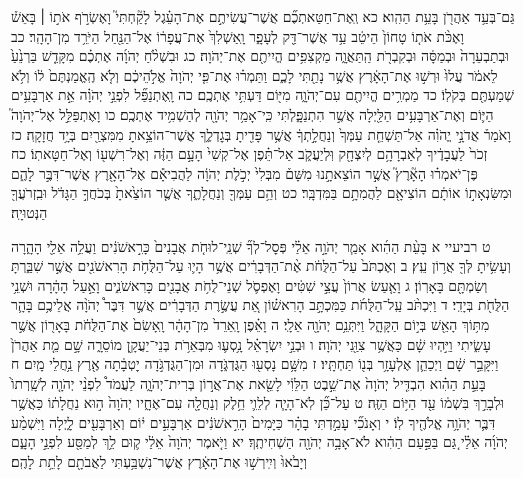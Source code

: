 \documentclass[twoside, openany, parskip=half, 11pt]{book}
\begin{document}
גַּם־בְּעַ֥ד אַהֲרֹ֖ן בָּעֵ֥ת הַהִֽוא׃ כא וְֽאֶת־חַטַּאתְכֶ֞ם אֲשֶׁר־עֲשִׂיתֶ֣ם אֶת־הָעֵ֗גֶל לָקַ֘חְתִּי֮ וָאֶשְׂרֹ֣ף אֹת֣וֹ ׀ בָּאֵשׁ֒ וָאֶכֹּ֨ת אֹת֤וֹ טָחוֹן֙ הֵיטֵ֔ב עַ֥ד אֲשֶׁר־דַּ֖ק לְעָפָ֑ר וָֽאַשְׁלִךְ֙ אֶת־עֲפָר֔וֹ אֶל־הַנַּ֖חַל הַיֹּרֵ֥ד מִן־הָהָֽר׃ כב וּבְתַבְעֵרָה֙ וּבְמַסָּ֔ה וּבְקִבְרֹ֖ת הַֽתַּאֲוָ֑ה מַקְצִפִ֥ים הֱיִיתֶ֖ם אֶת־יְהֹוָה׃ כג וּבִשְׁלֹ֨חַ יְהֹוָ֜ה אֶתְכֶ֗ם מִקָּדֵ֤שׁ בַּרְנֵ֙עַ֙ לֵאמֹ֔ר עֲלוּ֙ וּרְשׁ֣וּ אֶת־הָאָ֔רֶץ אֲשֶׁ֥ר נָתַ֖תִּי לָכֶ֑ם וַתַּמְר֗וּ אֶת־פִּ֤י יְהֹוָה֙ אֱלֹ֣הֵיכֶ֔ם וְלֹ֤א הֶֽאֱמַנְתֶּם֙ ל֔וֹ וְלֹ֥א שְׁמַעְתֶּ֖ם בְּקֹלֽוֹ׃ כד מַמְרִ֥ים הֱיִיתֶ֖ם עִם־יְהֹוָ֑ה מִיּ֖וֹם דַּעְתִּ֥י אֶתְכֶֽם׃ כה וָֽאֶתְנַפַּ֞ל לִפְנֵ֣י יְהֹוָ֗ה אֵ֣ת אַרְבָּעִ֥ים הַיּ֛וֹם וְאֶת־אַרְבָּעִ֥ים הַלַּ֖יְלָה אֲשֶׁ֣ר הִתְנַפָּ֑לְתִּי כִּֽי־אָמַ֥ר יְהֹוָ֖ה לְהַשְׁמִ֥יד אֶתְכֶֽם׃ כו וָאֶתְפַּלֵּ֣ל אֶל־יְהֹוָה֮ וָאֹמַר֒ אֲדֹנָ֣י יֱהֹוִ֗ה אַל־תַּשְׁחֵ֤ת עַמְּךָ֙ וְנַחֲלָ֣תְךָ֔ אֲשֶׁ֥ר פָּדִ֖יתָ בְּגׇדְלֶ֑ךָ אֲשֶׁר־הוֹצֵ֥אתָ מִמִּצְרַ֖יִם בְּיָ֥ד חֲזָקָֽה׃ כז זְכֹר֙ לַעֲבָדֶ֔יךָ לְאַבְרָהָ֥ם לְיִצְחָ֖ק וּֽלְיַעֲקֹ֑ב אַל־תֵּ֗פֶן אֶל־קְשִׁי֙ הָעָ֣ם הַזֶּ֔ה וְאֶל־רִשְׁע֖וֹ וְאֶל־חַטָּאתֽוֹ׃ כח פֶּן־יֹאמְר֗וּ הָאָ֘רֶץ֮ אֲשֶׁ֣ר הוֹצֵאתָ֣נוּ מִשָּׁם֒ מִבְּלִי֙ יְכֹ֣לֶת יְהֹוָ֔ה לַהֲבִיאָ֕ם אֶל־הָאָ֖רֶץ אֲשֶׁר־דִּבֶּ֣ר לָהֶ֑ם וּמִשִּׂנְאָת֣וֹ אוֹתָ֔ם הוֹצִיאָ֖ם לַהֲמִתָ֥ם בַּמִּדְבָּֽר׃ כט וְהֵ֥ם עַמְּךָ֖ וְנַחֲלָתֶ֑ךָ אֲשֶׁ֤ר הוֹצֵ֙אתָ֙ בְּכֹחֲךָ֣ הַגָּדֹ֔ל וּבִֽזְרֹעֲךָ֖ הַנְּטוּיָֽה׃

ט רביעיי א בָּעֵ֨ת הַהִ֜וא אָמַ֧ר יְהֹוָ֣ה אֵלַ֗י פְּסׇל־לְךָ֞ שְׁנֵֽי־לוּחֹ֤ת אֲבָנִים֙ כָּרִ֣אשֹׁנִ֔ים וַעֲלֵ֥ה אֵלַ֖י הָהָ֑רָה וְעָשִׂ֥יתָ לְּךָ֖ אֲר֥וֹן עֵֽץ׃ ב וְאֶכְתֹּב֙ עַל־הַלֻּחֹ֔ת אֶ֨ת־הַדְּבָרִ֔ים אֲשֶׁ֥ר הָי֛וּ עַל־הַלֻּחֹ֥ת הָרִאשֹׁנִ֖ים אֲשֶׁ֣ר שִׁבַּ֑רְתָּ וְשַׂמְתָּ֖ם בָּאָרֽוֹן׃ ג וָאַ֤עַשׂ אֲרוֹן֙ עֲצֵ֣י שִׁטִּ֔ים וָאֶפְסֹ֛ל שְׁנֵי־לֻחֹ֥ת אֲבָנִ֖ים כָּרִאשֹׁנִ֑ים וָאַ֣עַל הָהָ֔רָה וּשְׁנֵ֥י הַלֻּחֹ֖ת בְּיָדִֽי׃ ד וַיִּכְתֹּ֨ב עַֽל־הַלֻּחֹ֜ת כַּמִּכְתָּ֣ב הָרִאשׁ֗וֹן אֵ֚ת עֲשֶׂ֣רֶת הַדְּבָרִ֔ים אֲשֶׁ֣ר דִּבֶּר֩ יְהֹוָ֨ה אֲלֵיכֶ֥ם בָּהָ֛ר מִתּ֥וֹךְ הָאֵ֖שׁ בְּי֣וֹם הַקָּהָ֑ל וַיִּתְּנֵ֥ם יְהֹוָ֖ה אֵלָֽי׃ ה וָאֵ֗פֶן וָֽאֵרֵד֙ מִן־הָהָ֔ר וָֽאָשִׂם֙ אֶת־הַלֻּחֹ֔ת בָּאָר֖וֹן אֲשֶׁ֣ר עָשִׂ֑יתִי וַיִּ֣הְיוּ שָׁ֔ם כַּאֲשֶׁ֥ר צִוַּ֖נִי יְהֹוָה׃ ו וּבְנֵ֣י יִשְׂרָאֵ֗ל נָ֥סְע֛וּ מִבְּאֵרֹ֥ת בְּנֵי־יַעֲקָ֖ן מוֹסֵרָ֑ה שָׁ֣ם מֵ֤ת אַהֲרֹן֙ וַיִּקָּבֵ֣ר שָׁ֔ם וַיְכַהֵ֛ן אֶלְעָזָ֥ר בְּנ֖וֹ תַּחְתָּֽיו׃ ז מִשָּׁ֥ם נָסְע֖וּ הַגֻּדְגֹּ֑דָה וּמִן־הַגֻּדְגֹּ֣דָה יׇטְבָ֔תָה אֶ֖רֶץ נַ֥חֲלֵי מָֽיִם׃ ח בָּעֵ֣ת הַהִ֗וא הִבְדִּ֤יל יְהֹוָה֙ אֶת־שֵׁ֣בֶט הַלֵּוִ֔י לָשֵׂ֖את אֶת־אֲר֣וֹן בְּרִית־יְהֹוָ֑ה לַעֲמֹד֩ לִפְנֵ֨י יְהֹוָ֤ה לְשָֽׁרְתוֹ֙ וּלְבָרֵ֣ךְ בִּשְׁמ֔וֹ עַ֖ד הַיּ֥וֹם הַזֶּֽה׃ ט עַל־כֵּ֞ן לֹֽא־הָיָ֧ה לְלֵוִ֛י חֵ֥לֶק וְנַחֲלָ֖ה עִם־אֶחָ֑יו יְהֹוָה֙ ה֣וּא נַחֲלָת֔וֹ כַּאֲשֶׁ֥ר דִּבֶּ֛ר יְהֹוָ֥ה אֱלֹהֶ֖יךָ לֽוֹ׃ י וְאָנֹכִ֞י עָמַ֣דְתִּי בָהָ֗ר כַּיָּמִים֙ הָרִ֣אשֹׁנִ֔ים אַרְבָּעִ֣ים י֔וֹם וְאַרְבָּעִ֖ים לָ֑יְלָה וַיִּשְׁמַ֨ע יְהֹוָ֜ה אֵלַ֗י גַּ֚ם בַּפַּ֣עַם הַהִ֔וא לֹא־אָבָ֥ה יְהֹוָ֖ה הַשְׁחִיתֶֽךָ׃ יא וַיֹּ֤אמֶר יְהֹוָה֙ אֵלַ֔י ק֛וּם לֵ֥ךְ לְמַסַּ֖ע לִפְנֵ֣י הָעָ֑ם וְיָבֹ֙אוּ֙ וְיִֽירְשׁ֣וּ אֶת־הָאָ֔רֶץ אֲשֶׁר־נִשְׁבַּ֥עְתִּי לַאֲבֹתָ֖ם לָתֵ֥ת לָהֶֽם׃
\end{document}
